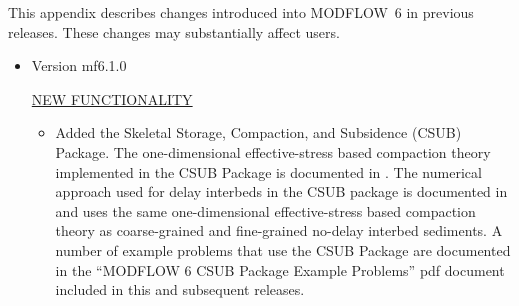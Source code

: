 This appendix describes changes introduced into MODFLOW~6 in previous releases. These changes may substantially affect users.

\begin{itemize}
	\item Version mf6.1.0
	
	\underline{NEW FUNCTIONALITY}
	\begin{itemize}
		\item Added the Skeletal Storage, Compaction, and Subsidence (CSUB) Package. The one-dimensional effective-stress based compaction theory implemented in the CSUB Package is documented in \cite{leake2007modflow}. The numerical approach used for delay interbeds in the CSUB package is documented in \cite{hoffmann2003modflow} and uses the same one-dimensional effective-stress based compaction theory as coarse-grained and fine-grained no-delay interbed sediments. A number of example problems that use the CSUB Package are documented in the ``MODFLOW 6 CSUB Package Example Problems'' pdf document included in this and subsequent releases.
	\end{itemize}
	

\end{itemize}
